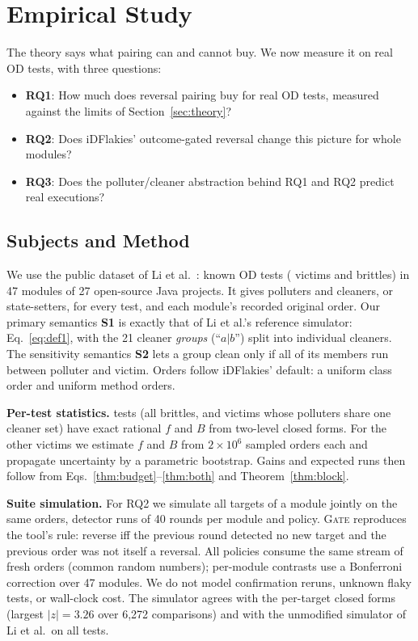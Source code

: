 \documentclass[conference,letterpaper]{IEEEtran}
\theoremstyle{definition}
\newcommand{\RQ}[1]{\textbf{RQ#1}}
\newcommand{\GATEp}{\textup{\textsc{Gate}}}
\begin{document}
\section{Empirical Study}\label{sec:empirical}
The theory says what pairing can and cannot buy. We now measure it on real OD tests, with three questions:
\begin{itemize}
\item \RQ{1}: How much does reversal pairing buy for real OD tests, measured against the limits of Section~\ref{sec:theory}?
\item \RQ{2}: Does iDFlakies' outcome-gated reversal change this picture for whole modules?
\item \RQ{3}: Does the polluter/cleaner abstraction behind RQ1 and RQ2 predict real executions?
\end{itemize}

\subsection{Subjects and Method}
We use the public dataset of Li et al.~\cite{li2023issta}: \NTargets{} known OD tests (\NVictims{} victims and \NBrittles{} brittles) in 47 modules of 27 open-source Java projects. It gives polluters and cleaners, or state-setters, for every test, and each module's recorded original order. Our primary semantics \textbf{S1} is exactly that of Li et al.'s reference simulator: Eq.~\eqref{eq:def1}, with the 21 cleaner \emph{groups} (``$a|b$'') split into individual cleaners. The sensitivity semantics \textbf{S2} lets a group clean only if all of its members run between polluter and victim. Orders follow iDFlakies' default: a uniform class order and uniform method orders.

\textbf{Per-test statistics.} \NExact{} tests (all brittles, and victims whose polluters share one cleaner set) have exact rational $f$ and $B$ from two-level closed forms. For the other \NMC{} victims we estimate $f$ and $B$ from $2\times10^6$ sampled orders each and propagate uncertainty by a parametric bootstrap. Gains and expected runs then follow from Eqs.~\eqref{thm:budget}--\eqref{thm:both} and Theorem~\ref{thm:block}.

\textbf{Suite simulation.} For RQ2 we simulate all targets of a module jointly on the same orders, \Runs{} detector runs of 40 rounds per module and policy. \GATEp{} reproduces the tool's rule: reverse iff the previous round detected no new target and the previous order was not itself a reversal. All policies consume the same stream of fresh orders (common random numbers); per-module contrasts use a Bonferroni correction over 47 modules. We do not model confirmation reruns, unknown flaky tests, or wall-clock cost. The simulator agrees with the per-target closed forms (largest $|z|=3.26$ over 6{,}272 comparisons) and with the unmodified simulator of Li et al.\ on all \NTargets{} tests.
\end{document}
